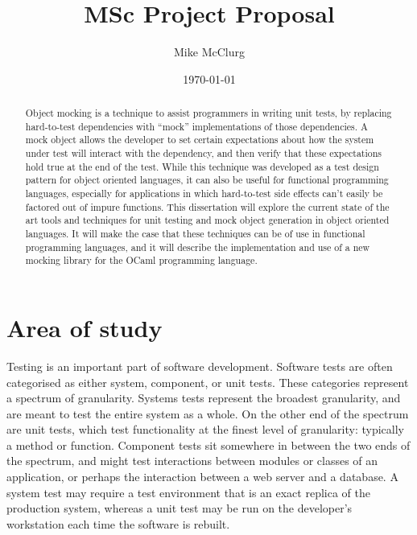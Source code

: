 \documentclass[proposal]{softeng}
\title{MSc Project Proposal}
\author{Mike McClurg}
\date{\today}
\begin{document}
\maketitle

\begin{abstract}


  Object mocking is a technique to assist programmers in writing unit
  tests, by replacing hard-to-test dependencies with ``mock''
  implementations of those dependencies. A mock object allows the
  developer to set certain expectations about how the system under
  test will interact with the dependency, and then verify that these
  expectations hold true at the end of the test. While this technique
  was developed as a test design pattern for object oriented
  languages, it can also be useful for functional programming
  languages, especially for applications in which hard-to-test side
  effects can't easily be factored out of impure functions. This
  dissertation will explore the current state of the art tools and
  techniques for unit testing and mock object generation in object
  oriented languages. It will make the case that these techniques can
  be of use in functional programming languages, and it will describe
  the implementation and use of a new mocking library for the OCaml
  programming language.


\end{abstract}

\section{Area of study}


Testing is an important part of software development. Software tests
are often categorised as either system, component, or unit
tests. These categories represent a spectrum of granularity. Systems
tests represent the broadest granularity, and are meant to test the
entire system as a whole. On the other end of the spectrum are unit
tests, which test functionality at the finest level of granularity:
typically a method or function. Component tests sit somewhere in
between the two ends of the spectrum, and might test interactions
between modules or classes of an application, or perhaps the
interaction between a web server and a database. A system test may
require a test environment that is an exact replica of the production
system, whereas a unit test may be run on the developer's workstation
each time the software is rebuilt.
\end{document}
